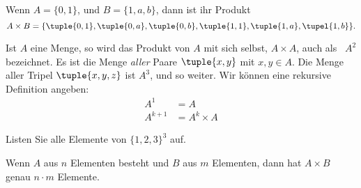 \documentclass[../../../include/open-logic-section]{subfiles}
\begin{document}
\begin{ex}
Wenn $A = \{0, 1\}$, und $B = \{1, a, b\}$, dann ist ihr Produkt
\[
A \times B = \{ \tuple{0, 1}, \tuple{0, a}, \tuple{0, b},
    \tuple{1, 1}, \tuple{1, a}, \tupel{1, b} \}.
\]
\end{ex}

\begin{ex}
Ist $A$ eine Menge, so wird das Produkt von $A$ mit sich selbst, $A \times A$, auch
als ~$A^2$ bezeichnet. Es ist die Menge \emph{aller} Paare $\tuple{x, y}$ mit
$x, y \in A$. Die Menge aller Tripel $\tuple{x, y, z}$ ist $A^3$,
und so weiter. Wir können eine rekursive Definition angeben:
\begin{align*}
  A^1 & = A\\
  A^{k+1} & = A^k \times A
\end{align*}
\end{ex}

\begin{prob}
Listen Sie alle Elemente von $\{1, 2, 3\}^3$ auf.
\end{prob}

\begin{prop}
Wenn $A$ aus $n$ Elementen besteht und $B$ aus $m$ Elementen, dann hat $A
\times B$ genau $n\cdot m$ Elemente.
\end{prop}
\end{document}
